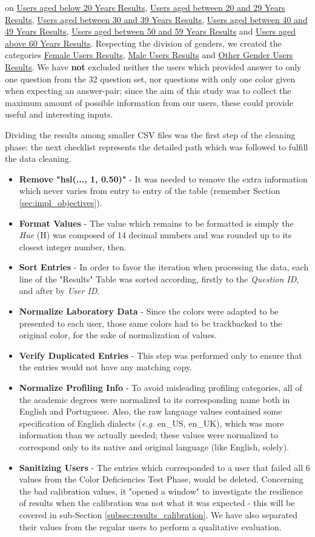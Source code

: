 on \ul{Users aged below 20 Years Results}, \ul{Users aged between 20 and 29 Years Results}, \ul{Users aged between 30 and 39 Years Results},
\ul{Users aged between 40 and 49 Years Results}, \ul{Users aged between 50 and 59 Years Results} and \ul{Users aged above 60 Years Results}.
Respecting the division of genders, we created the categories \ul{Female Users Results}, \ul{Male Users Results} and \ul{Other Gender Users Results}. We
have \textbf{not} excluded neither the users which provided answer to only one question from the 32 question set, nor questions with only one color given when
expecting an answer-pair; since the aim of this study was to collect the maximum amount of possible information from our users, these could provide
useful and interesting inputs. \par
%
Dividing the results among smaller \gls{CSV} files was the first step of the cleaning phase: the next checklist represents the detailed path which
was followed to fulfill the data cleaning.
%
\begin{itemize}
  \setlength\itemsep{0.01em}
  \item \textbf{Remove "hsl(..., 1, 0.50)"} - It was needed to remove the extra information which never varies from entry to entry of the table
  (remember Section \ref{sec:impl_objectives}).
  \item \textbf{Format Values} - The value which remains to be formatted is simply the \emph{Hue} (H) was composed of 14 decimal numbers and
  was rounded up to its closest integer number, then.
  \item \textbf{Sort Entries} - In order to favor the iteration when processing the data, each line of the "Results" Table was
  sorted according, firstly to the \emph{Question ID}, and after by \emph{User ID}.
  \item \textbf{Normalize Laboratory Data} - Since the colors were adapted to be presented to each user, those same colors had to be trackbacked to the original color, for the
  sake of normalization of values.
  \item \textbf{Verify Duplicated Entries} - This step was performed only to ensure that the entries would not have any matching copy.
  \item \textbf{Normalize Profiling Info} - To avoid misleading profiling categories, all of the academic degrees were normalized to its corresponding
  name both in English and Portuguese. Also, the raw language values contained some specification of English dialects (\emph{e.g.} en\_US, en\_UK),
  which was more information than we actually needed; these values were normalized to correspond only to its native and original language (like English, solely).
  \item \textbf{Sanitizing Users} - The entries which corresponded to a user that failed all 6 values from the Color Deficiencies Test Phase, would be
  deleted. Concerning the bad calibration values, it "opened a window" to investigate the resilience of results when the
  calibration was not what it was expected - this will be covered in sub-Section \ref{subsec:results_calibration}. We have also separated their values from
  the regular users to perform a qualitative evaluation.
\end{itemize} \par

